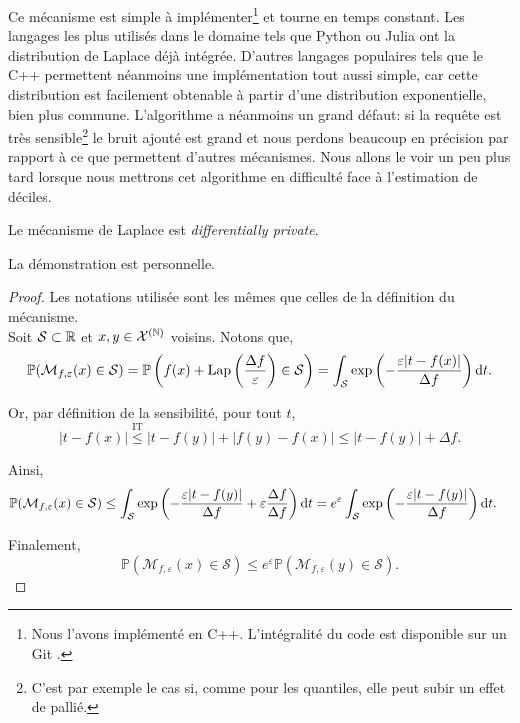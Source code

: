 Ce mécanisme est simple à implémenter\footnote{Nous l'avons implémenté en C++. L'intégralité du code est disponible sur un Git \cite{git}. } et tourne en temps constant. Les langages les plus utilisés dans le domaine tels que Python ou Julia ont la distribution de {\sc Laplace} déjà intégrée. D'autres langages populaires tels que le C++ permettent néanmoins une implémentation tout aussi simple, car cette distribution est facilement obtenable à partir d'une distribution exponentielle, bien plus commune. L'algorithme a néanmoins un grand défaut: si la requête est très sensible\footnote{C'est par exemple le cas si, comme pour les quantiles, elle peut subir un effet de pallié.} le bruit ajouté est grand et nous perdons beaucoup en précision par rapport à ce que permettent d'autres mécanismes. Nous allons le voir un peu plus tard lorsque nous mettrons cet algorithme en difficulté face à l'estimation de déciles.\\
 
\begin{theorem}
    Le mécanisme de {\sc Laplace} est \textit{differentially private}.
\end{theorem}


\begin{remark}
    La démonstration est personnelle.
\end{remark}

\begin{proof}
    Les notations utilisée sont les mêmes que celles de la définition du mécanisme.\\
    Soit \(\mathcal S \subset \mathbb{R}\) et \(x,y \in \mathcal X^{(\mathbb{N})}\) voisins. Notons que,
    \begin{align*}
        \mathbb P(\mathcal M_{f,\varepsilon}(x) \in \mathcal S) = \mathbb P\left( f(x) + \text{Lap}\left( \dfrac{\Delta f}{\varepsilon} \right) \in \mathcal S\right) = \int_\mathcal S \exp\left( -\dfrac{\varepsilon |t - f(x)|}{\Delta f} \right) \mathrm{d} t.
    \end{align*}

    Or, par définition de la sensibilité, pour tout \(t\),
    \[
        |t - f(x)| \overset{\text{IT}}{\leq} |t - f(y)| + |f(y) - f(x)| \leq |t - f(y)| + \Delta f.
    \]

    Ainsi,
    \begin{align*}
        \mathbb P(\mathcal M_{f,\varepsilon}(x) \in \mathcal S) & \leq \int_\mathcal S \exp\left( -\dfrac{\varepsilon |t - f(y)|}{\Delta f} + \varepsilon \dfrac{\Delta f}{\Delta f}   \right) \mathrm{d} t = e^\varepsilon\int_\mathcal S \exp\left( -\dfrac{\varepsilon |t - f(y)|}{\Delta f} \right) \mathrm{d} t.
    \end{align*}

    Finalement,
    \[ \mathbb P(\mathcal M_{f,\varepsilon}(x) \in \mathcal S) \leq e^{\varepsilon} \mathbb P(\mathcal M_{f,\varepsilon}(y) \in \mathcal S).\]
\end{proof}


